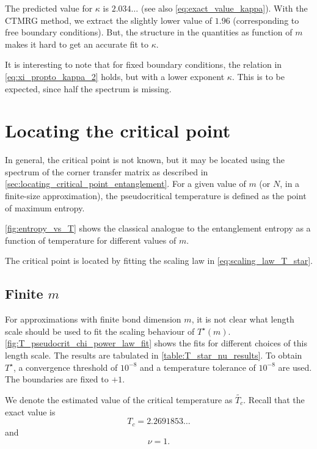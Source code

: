The predicted value for $\kappa$ \cite{pollmann2009theory} is $2.034\dots$ (see also \autoref{eq:exact_value_kappa}).
With the CTMRG method, we extract the slightly lower value of $1.96$ (corresponding to free boundary conditions).
But, the structure in the quantities as function of $m$ makes it hard to get an accurate fit to $\kappa$.

It is interesting to note that for fixed boundary conditions, the relation in \autoref{eq:xi_propto_kappa_2} holds,
but with a lower exponent $\kappa$. This is to be expected, since half the spectrum is missing.

\section{Locating the critical point}\label{sec:locating_the_critical_point}

In general, the critical point is not known, but it may be located using the spectrum of the corner transfer matrix as
described in \autoref{sec:locating_critical_point_entanglement}. For a given value of $m$ (or $N$, in a finite-size approximation), the pseudocritical temperature is defined as the point of maximum entropy.

\autoref{fig:entropy_vs_T} shows the classical analogue to the entanglement entropy as a function of temperature for
different values of $m$.

The critical point is located by fitting the scaling law in \autoref{eq:scaling_law_T_star}.

\subsection{Finite $m$}
For approximations with finite bond dimension $m$, it is not clear what length scale should be used to fit the scaling
behaviour of $T^{\star}(m)$.
\autoref{fig:T_pseudocrit_chi_power_law_fit} shows the fits for different choices of this length scale.
The results are tabulated in \autoref{table:T_star_nu_results}.
To obtain $T^{\star}$, a convergence threshold of $10^{-8}$ and a temperature tolerance of $10^{-8}$ are used.
The boundaries are fixed to $+1$.

We denote the estimated value of the critical temperature as $\widetilde{T_c}$. Recall that the exact value is
\begin{equation}
  T_c = 2.2691853\dots
\end{equation}
and
\begin{equation}
  \nu = 1.
\end{equation}

